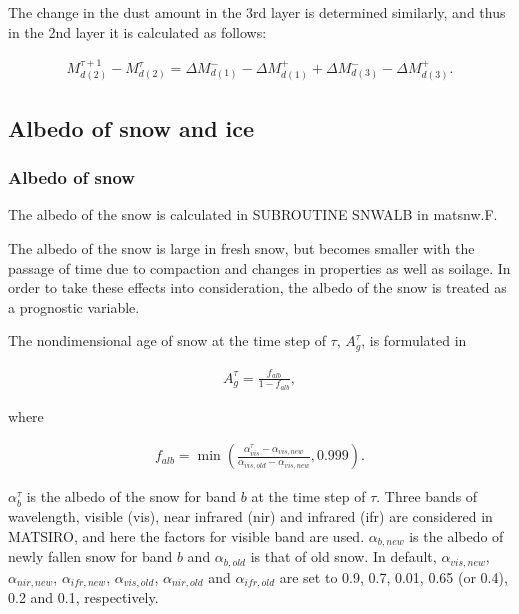 The change in the dust amount in the 3rd layer is determined similarly, and thus in the 2nd layer it is calculated as follows:

\begin{eqnarray}
M_{d(2)}^{\tau+1} - M_{d(2)}^{\tau}
 = \Delta M_{d(1)}^{-} - \Delta M_{d(1)}^{+} + \Delta M_{d(3)}^{-} - \Delta M_{d(3)}^{+}. \label{8-55}
\end{eqnarray}

\hypertarget{albedo-of-snow-and-ice}{%
\subsection{Albedo of snow and ice}\label{albedo-of-snow-and-ice}}

\hypertarget{albedo-of-snow}{%
\subsubsection{Albedo of snow}\label{albedo-of-snow}}

The albedo of the snow is calculated in SUBROUTINE SNWALB in matsnw.F.

The albedo of the snow is large in fresh snow, but becomes smaller with the passage of time due to compaction and changes in properties as well as soilage. In order to take these effects into
consideration, the albedo of the snow is treated as a prognostic variable.

The nondimensional age of snow at the time step of \({\tau}\), \(A_g^{\tau}\), is formulated in

\begin{eqnarray}
A_g^{\tau} = \frac{f_{alb}}{1-f_{alb}}, \label{8-56}
\end{eqnarray}

where

\begin{eqnarray}
f_{alb} = \min\left(
 \frac{\alpha_{vis}^{\tau}-\alpha_{vis,new}}{\alpha_{vis,old}-\alpha_{vis,new}}, 0.999
\right). \label{8-57}
\end{eqnarray}

\(\alpha_b^{\tau}\) is the albedo of the snow for band \(b\) at the time step of \(\tau\). Three bands of wavelength, visible (vis), near infrared (nir) and infrared (ifr) are considered in MATSIRO,
and here the factors for visible band are used. \(\alpha_{b,new}\) is the albedo of newly fallen snow for band \(b\) and \(\alpha_{b,old}\) is that of old snow. In default, \(\alpha_{vis,new}\),
\(\alpha_{nir,new}\), \(\alpha_{ifr,new}\), \(\alpha_{vis,old}\), \(\alpha_{nir,old}\) and \(\alpha_{ifr,old}\) are set to 0.9, 0.7, 0.01, 0.65 (or 0.4), 0.2 and 0.1, respectively.

